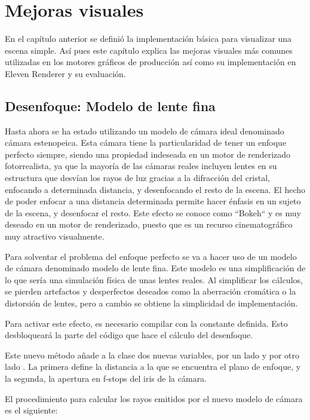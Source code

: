 \chapter{Mejoras visuales}
				
En el capítulo anterior se definió la implementación básica para visualizar una escena simple. Así pues este capítulo explica las mejoras visuales más comunes utilizadas en los motores gráficos de producción así como su implementación en Eleven Renderer y su evaluación.
	
\section{Desenfoque: Modelo de lente fina}
	
Hasta ahora se ha estado utilizando un modelo de cámara ideal denominado cámara estenopeica. Esta cámara tiene la particularidad de tener un enfoque perfecto siempre, siendo una propiedad indeseada en un motor de renderizado fotorrealista, ya que la mayoría de las cámaras reales incluyen lentes en su estructura que desvían los rayos de luz gracias a la difracción del cristal, enfocando a determinada distancia, y desenfocando el resto de la escena. El hecho de poder enfocar a una distancia determinada permite hacer énfasis en un sujeto de la escena, y desenfocar el resto. Este efecto se conoce como ``Bokeh`` y es muy deseado en un motor de renderizado, puesto que es un recurso cinematográfico muy atractivo visualmente.

Para solventar el problema del enfoque perfecto se va a hacer uso de un modelo de cámara denominado modelo de lente fina. Este modelo es una simplificación de lo que sería una simulación física de unas lentes reales. Al simplificar los cálculos, se pierden artefactos y desperfectos deseados como la aberración cromática o la distorsión de lentes, pero a cambio se obtiene la simplicidad de implementación.

Para activar este efecto, es necesario compilar con la constante  definida. Esto desbloqueará la parte del código que hace el cálculo del desenfoque. 
	
Este nuevo método añade a la clase  dos nuevas variables, por un lado  y por otro lado . La primera define la distancia a la que se encuentra el plano de enfoque, y la segunda, la apertura en f-stops del iris de la cámara. 

El procedimiento para calcular los rayos emitidos por el nuevo modelo de cámara es el siguiente:

